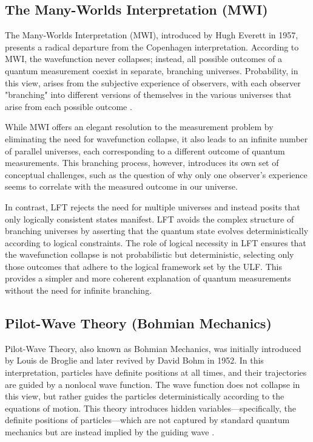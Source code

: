 \subsection{The Many-Worlds Interpretation (MWI)}
The Many-Worlds Interpretation (MWI), introduced by Hugh Everett in 1957, presents a radical departure from the Copenhagen interpretation. According to MWI, the wavefunction never collapses; instead, all possible outcomes of a quantum measurement coexist in separate, branching universes. Probability, in this view, arises from the subjective experience of observers, with each observer "branching" into different versions of themselves in the various universes that arise from each possible outcome \cite{everett1957}.

While MWI offers an elegant resolution to the measurement problem by eliminating the need for wavefunction collapse, it also leads to an infinite number of parallel universes, each corresponding to a different outcome of quantum measurements. This branching process, however, introduces its own set of conceptual challenges, such as the question of why only one observer's experience seems to correlate with the measured outcome in our universe.

In contrast, LFT rejects the need for multiple universes and instead posits that only logically consistent states manifest. LFT avoids the complex structure of branching universes by asserting that the quantum state evolves deterministically according to logical constraints. The role of logical necessity in LFT ensures that the wavefunction collapse is not probabilistic but deterministic, selecting only those outcomes that adhere to the logical framework set by the ULF. This provides a simpler and more coherent explanation of quantum measurements without the need for infinite branching.

\subsection{Pilot-Wave Theory (Bohmian Mechanics)}
Pilot-Wave Theory, also known as Bohmian Mechanics, was initially introduced by Louis de Broglie and later revived by David Bohm in 1952. In this interpretation, particles have definite positions at all times, and their trajectories are guided by a nonlocal wave function. The wave function does not collapse in this view, but rather guides the particles deterministically according to the equations of motion. This theory introduces hidden variables—specifically, the definite positions of particles—which are not captured by standard quantum mechanics but are instead implied by the guiding wave \cite{bohm1952}.

